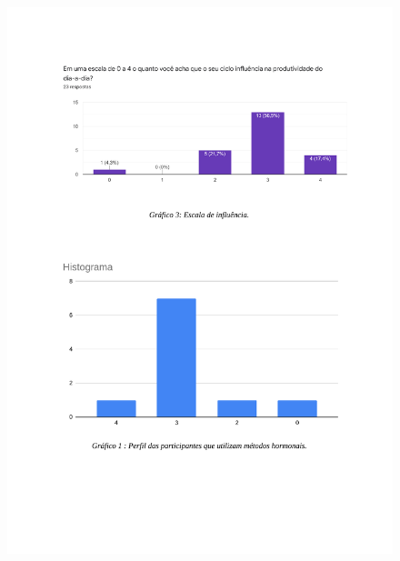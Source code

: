 \begin{apendicesenv}
        \begin{figure}[ht]
            \centering
            \includegraphics[keepaspectratio=true,scale=0.7]{figuras/Tab8.pdf}
        \end{figure}
        

\end{apendicesenv}
